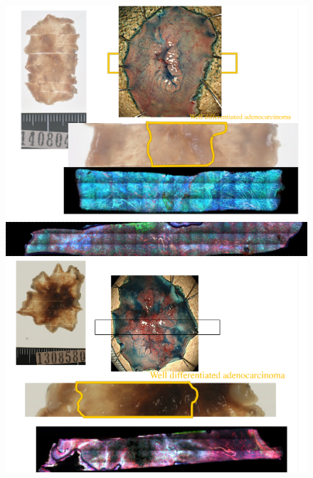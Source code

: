 \begin{figure}[H]
	\centering
	
	\begin{minipage}{0.45\columnwidth}
		\centering
		\includegraphics[clip, angle=270, width=\linewidth]{fig/raw_data/summary/C-013}
	\end{minipage}
	\begin{minipage}{0.45\linewidth}
		\centering
		\includegraphics[clip, width=\linewidth]{fig/raw_data/summary/C-012}
	\end{minipage}
	\begin{minipage}{0.45\columnwidth}
		\centering
		\includegraphics[clip, angle=270, width=\linewidth]{fig/raw_data/summary/C-009}

\end{minipage}
\end{figure}
